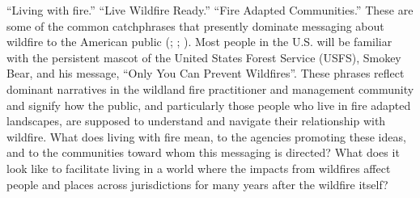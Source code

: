 \documentclass[
]{article}
\begin{document}
``Living with fire.'' ``Live Wildfire Ready.'' ``Fire Adapted Communities.'' These are some of the common catchphrases that presently dominate messaging about wildfire to the American public (; ; ). Most people in the U.S. will be familiar with the persistent mascot of the United States Forest Service (USFS), Smokey Bear, and his message, ``Only You Can Prevent Wildfires''. These phrases reflect dominant narratives in the wildland fire practitioner and management community and signify how the public, and particularly those people who live in fire adapted landscapes, are supposed to understand and navigate their relationship with wildfire. What does living with fire mean, to the agencies promoting these ideas, and to the communities toward whom this messaging is directed? What does it look like to facilitate living in a world where the impacts from wildfires affect people and places across jurisdictions for many years after the wildfire itself?
\end{document}
